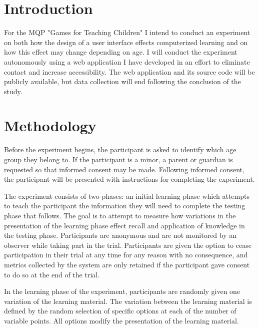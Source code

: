 \documentclass[12pt]{article}
\begin{document}
\tableofcontents

\clearpage


\setcounter{page}{1}

\section{Introduction}

For the MQP "Games for Teaching Children" I intend to conduct an experiment on both how the design of a user interface effects computerized learning and on how this effect may change depending on age. I will conduct the experiment autonomously using a web application I have developed in an effort to eliminate contact and increase accessibility. The web application and its source code will be publicly available, but data collection will end following the conclusion of the study.

\section{Methodology}
\label{ch:Methodology}

Before the experiment begins, the participant is asked to identify which age group they belong to. If the participant is a minor, a parent or guardian is requested so that informed consent may be made. Following informed consent, the participant will be presented with instructions for completing the experiment.

The experiment consists of two phases: an initial learning phase which attempts to teach the participant the information they will need to complete the testing phase that follows. The goal is to attempt to measure how variations in the presentation of the learning phase effect recall and application of knowledge in the testing phase. Participants are anonymous and are not monitored by an observer while taking part in the trial. Participants are given the option to cease participation in their trial at any time for any reason with no consequence, and metrics collected by the system are only retained if the participant gave consent to do so at the end of the trial.

In the learning phase of the experiment, participants are randomly given one variation of the learning material. The variation between the learning material is defined by the random selection of specific options at each of the number of variable points. All options modify the presentation of the learning material.
\end{document}
